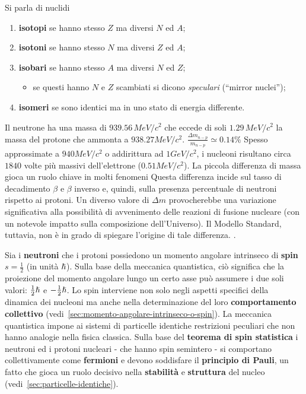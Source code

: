 Si parla di nuclidi

\begin{enumerate}
    \item \textbf{isotopi} se hanno stesso $Z$ ma diversi $N$ ed $A$;
    \item  \textbf{isotoni} se hanno stesso $N$ ma diversi $Z$ ed $A$;
    \item \textbf{isobari} se hanno stesso $A$ ma diversi $N$ ed $Z$;
    \begin{itemize}
        \item  se questi hanno $N$ e $Z$ scambiati si dicono \emph{speculari} (``mirror nuclei'');
    \end{itemize}
    \item \textbf{isomeri} se sono identici ma in uno stato di energia differente.
\end{enumerate}

Il neutrone ha una massa di $939.56 \, MeV/c^2$ che eccede di soli $1.29 \, MeV / c^2$ la massa del protone che ammonta a
$938.27 MeV/c^2$.
\marginnote
{ $ \frac{\Delta m_{n-p}}{m_{n-p}} \simeq 0.14 \%$}
Spesso approssimate a $940 MeV/c^2$ o addirittura ad $1 GeV/c^2$, i nucleoni risultano circa $1840$ volte più massivi
dell'elettrone ($0.51 MeV/c^2$).
La piccola differenza di massa gioca un ruolo chiave in molti fenomeni\sidenote
{
Questa differenza incide sul tasso di decadimento $ \beta$ e $ \beta$ inverso e, quindi, sulla
presenza percentuale di neutroni rispetto ai protoni. Un diverso valore di $ \Delta m$ provocherebbe
una variazione significativa alla possibilità di avvenimento delle reazioni di fusione nucleare (con un notevole impatto sulla composizione dell'Universo).
Il Modello Standard, tuttavia, non è in grado di spiegare l'origine di tale differenza.
}.
\bigskip

Sia i \textbf{neutroni} che i protoni possiedono un momento angolare intrinseco di \textbf{spin} $s=\frac{1}{2}$ (in unità $\hslash$).
Sulla base della meccanica quantistica, ciò significa che la proiezione del momento angolare lungo un certo asse può assumere i due soli valori: $\frac{1}{2} \hslash$ e $-\frac{1}{2}\hslash$.
Lo spin interviene non solo negli aspetti specifici della dinamica dei nucleoni ma anche nella determinazione del loro \textbf{comportamento collettivo} (vedi~\ref{sec:momento-angolare-intrinseco-o-spin}).
La meccanica quantistica impone ai sistemi di particelle identiche restrizioni peculiari che non hanno analogie nella fisica classica.
Sulla base del \textbf{teorema di spin statistica} i neutroni ed i protoni nucleari - che hanno spin semintero -
si comportano collettivamente come \textbf{fermioni} e devono soddisfare il \textbf{principio di Pauli}, un fatto che
gioca un ruolo decisivo nella \textbf{stabilità} e \textbf{struttura} del nucleo (vedi~\ref{sec:particelle-identiche}).
\bigskip

